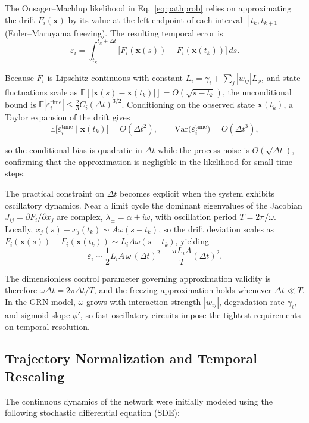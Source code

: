 \documentclass[10pt, aps, rmp,  twocolumn, superscriptaddress, floatfix, showkeys]{revtex4-2}
\begin{document}
The Onsager–Machlup likelihood in Eq.~\eqref{eq:pathprob} relies on approximating the drift $F_i(\mathbf{x})$ by its value at the left endpoint of each interval $[t_k,t_{k+1}]$ (Euler–Maruyama freezing).
The resulting temporal error is
\[
  \varepsilon_i
  = \int_{t_k}^{t_k+\Delta t}\!\bigl[F_i(\mathbf{x}(s))-F_i(\mathbf{x}(t_k))\bigr]\,ds.
\]

Because $F_i$ is Lipschitz-continuous with constant $L_i = \gamma_i + \sum_j |w_{ij}|L_\phi$, and state fluctuations scale as $\mathbb{E}[|\mathbf{x}(s)-\mathbf{x}(t_k)|]=O(\sqrt{s-t_k})$, the unconditional bound is $\mathbb{E}|\varepsilon_i^{\text{time}}|\le\tfrac{2}{3}C_i(\Delta t)^{3/2}$.
Conditioning on the observed state $\mathbf{x}(t_k)$, a Taylor expansion of the drift gives
\[
  \mathbb{E}\bigl[\varepsilon_i^{\text{time}}\mid\mathbf{x}(t_k)\bigr] = O(\Delta t^2),
  \qquad
  \mathrm{Var}\bigl(\varepsilon_i^{\text{time}}\bigr) = O(\Delta t^3),
\]

so the conditional bias is quadratic in $\Delta t$ while the process noise is $O(\sqrt{\Delta t})$, confirming that the approximation is negligible in the likelihood for small time steps.

The practical constraint on $\Delta t$ becomes explicit when the system exhibits oscillatory dynamics.
Near a limit cycle the dominant eigenvalues of the Jacobian $J_{ij}=\partial F_i/\partial x_j$ are complex, $\lambda_\pm=\alpha\pm i\omega$, with oscillation period $T=2\pi/\omega$.
Locally, $x_j(s)-x_j(t_k)\sim A\omega(s-t_k)$, so the drift deviation scales as $F_i(\mathbf{x}(s))-F_i(\mathbf{x}(t_k))\sim L_i A\omega(s-t_k)$, yielding
\[
  \varepsilon_i
  \sim \frac{1}{2}L_i A\,\omega\,(\Delta t)^2
  = \frac{\pi L_i A}{T}(\Delta t)^2.
\] 

The dimensionless control parameter governing approximation validity is therefore $\omega\Delta t = 2\pi\Delta t/T$, and the freezing approximation holds whenever $\Delta t\ll T$.
In the GRN model, $\omega$ grows with interaction strength $|w_{ij}|$, degradation rate $\gamma_i$, and sigmoid slope $\phi'$, so fast oscillatory circuits impose the tightest requirements on temporal resolution.

\subsection{Trajectory Normalization and Temporal Rescaling}

The continuous dynamics of the network were initially modeled using the following stochastic differential equation (SDE):
\end{document}
